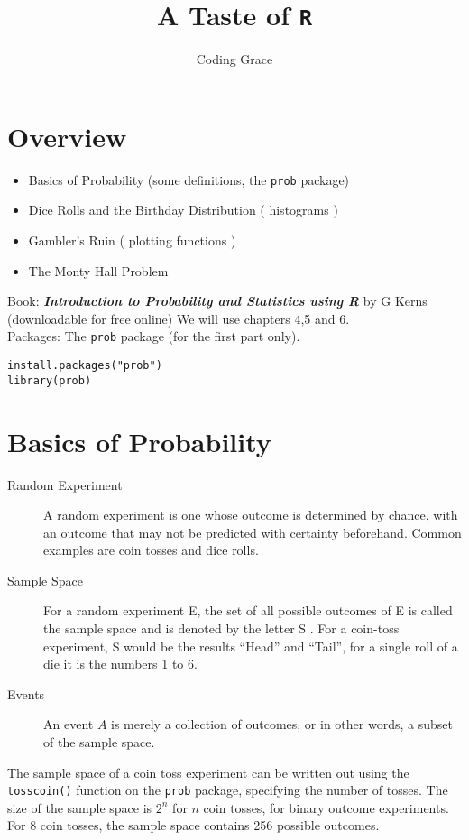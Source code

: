 \documentclass[11pt]{article} %
\title{ A Taste of \texttt{R}}
\author{Coding Grace}
\begin{document}
\maketitle
\section{Overview}

\begin{itemize}
\item Basics of Probability (some definitions, the \texttt{prob} package) 
\item Dice Rolls and the Birthday Distribution ( histograms )
\item Gambler's Ruin ( plotting functions )
\item The Monty Hall Problem 
\end{itemize}
Book: \textbf{\textit{Introduction to Probability and Statistics using R}} by G Kerns \\ (downloadable for free online) We will use chapters 4,5 and 6. \\ \bigskip
Packages: The \texttt{prob} package (for the first part only).

\begin{framed}
\begin{verbatim}
install.packages("prob")
library(prob)
\end{verbatim}
\end{framed}
\newpage
\section{Basics of Probability}

\begin{description}
\item[Random Experiment] A random experiment is one whose outcome is determined by chance, with an outcome that may not be predicted with certainty beforehand. Common examples are coin tosses and dice rolls.
\item[Sample Space] For a random experiment E, the set of all possible outcomes of E is called the sample space and
is denoted by the letter S . For a coin-toss experiment, S would be the results ``Head” and ``Tail”, for a  single roll of a die it is the numbers 1 to 6.
\item[Events] An event $A$
 is merely a collection of outcomes, or in other words, a subset of the sample space.
\end{description}
The sample space of a coin toss experiment can be written out using the \texttt{tosscoin()} function on the \texttt{prob} package, specifying the number of tosses. The size of the sample space is $2^n$ for $n$ coin tosses, for binary outcome experiments. For 8 coin tosses, the sample space contains 256 possible outcomes.
\end{document}
